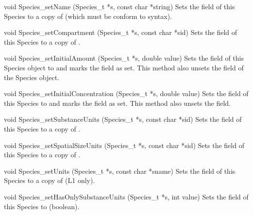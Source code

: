 \documentclass{sbmlmanual}
\begin{document}
\begin{methoddef}{void Species\_setName (Species\_t *s, const char *string)}
  Sets the  field of this Species to a copy of 
  (which must be conform to  syntax).
\end{methoddef}


\begin{methoddef}{void Species\_setCompartment (Species\_t *s, const char *sid)}
  Sets the  field of this Species to a copy of
  .
\end{methoddef}


\begin{methoddef}{void Species\_setInitialAmount (Species\_t *s, double value)}
  Sets the  field of this Species object to
   and marks the field as set.  This method also unsets the
   field of the Species object.
\end{methoddef}


\begin{methoddef}{void Species\_setInitialConcentration (Species\_t *s, double value)}
  Sets the  field of this Species to
   and marks the field as set.  This method also unsets the
   field.
\end{methoddef}


\begin{methoddef}{void Species\_setSubstanceUnits (Species\_t *s, const char *sid)}
  Sets the  field of this Species to a copy of .
\end{methoddef}


\begin{methoddef}{void Species\_setSpatialSizeUnits (Species\_t *s, const char *sid)}
  Sets the  field of this Species to a copy of .
\end{methoddef}


\begin{methoddef}{void Species\_setUnits (Species\_t *s, const char *sname)}
  Sets the  field of this Species to a copy of 
  (L1 only).
\end{methoddef}


\begin{methoddef}{void Species\_setHasOnlySubstanceUnits (Species\_t *s, int value)}
  Sets the  field of this Species to
   (boolean).
\end{methoddef}
\end{document}
